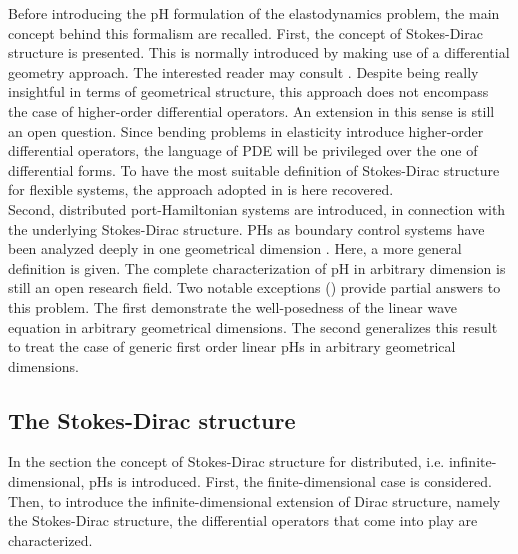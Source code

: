 Before introducing the pH formulation of the elastodynamics problem, the main concept behind this formalism are recalled. First, the concept of Stokes-Dirac structure is presented. This is normally introduced by making use of a differential geometry approach. The interested reader may consult \cite[Chapter 2]{kotyczka2019numerical}. Despite being really insightful in terms of geometrical structure, this approach does not encompass the case of higher-order differential operators. An extension in this sense is still an open question. Since bending problems in elasticity introduce higher-order differential operators, the language of PDE will be privileged over the one of differential forms. To have the most suitable definition of Stokes-Dirac structure for flexible systems, the approach adopted in \cite{macchelli2005modelling} is here recovered. \\

Second, distributed port-Hamiltonian systems are introduced, in connection with the underlying Stokes-Dirac structure. PHs as boundary control systems have been analyzed deeply in one geometrical dimension \cite{zwart2012,legorrec2005}. Here, a more general definition is given. The complete characterization of pH in arbitrary dimension is still an open research field. Two notable exceptions (\cite{zwart2015wave,skrepek2019wellposedness}) provide partial answers to this problem. The first demonstrate the well-posedness of the linear wave equation in arbitrary geometrical dimensions. The second generalizes this result to treat the case of generic first order linear pHs in arbitrary geometrical dimensions.

 
\subsection{The Stokes-Dirac structure}

In the section the concept of Stokes-Dirac structure for distributed, i.e. infinite-dimensional, pHs is introduced. First, the finite-dimensional case is considered. Then, to introduce the infinite-dimensional extension of Dirac structure, namely the Stokes-Dirac structure, the differential operators that come into play are characterized. 

